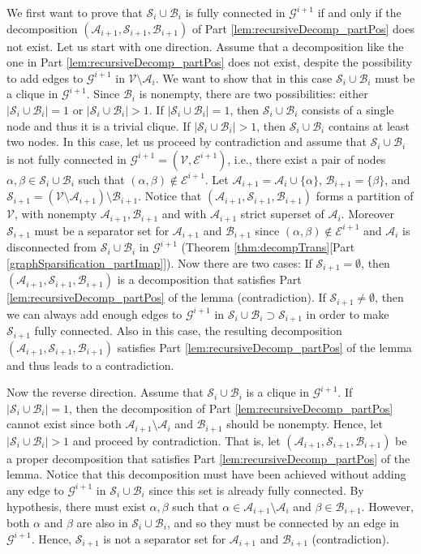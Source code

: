\documentclass[twoside,11pt]{article}
\newcommand{\Bc}{\mathcal{B}}
\newcommand{\Vc}{\mathcal{V}}
\newcommand{\Ec}{\mathcal{E}}
\newcommand{\Ac}{\mathcal{A}}
\newcommand{\Sc}{\mathcal{S}}
\newcommand{\Gcb}{\boldsymbol{\mathcal{G}}}
\newcommand{\Aset}{ \Ac }
\newcommand{\Bset}{ \Bc }
\newcommand{\Sset}{ \Sc }
\begin{document}
We first want to prove that 
$\Sset_i \cup \Bset_i$ is fully connected in $\Gcb^{i+1}$ if and only if
the decomposition $(\Aset_{i+1}, \Sset_{i+1}, \Bset_{i+1})$  of
Part \ref{lem:recursiveDecomp_partPos} does not exist.
Let us start with one direction.
%
%
%
Assume that a decomposition like the one in Part 
\ref{lem:recursiveDecomp_partPos}
does not exist, despite the
possibility to add edges to $\Gcb^{i+1}$ in $\Vc \setminus \Aset_i$. 
We want to show that in this case 
$\Sset_i \cup \Bset_i$ must be a clique in $\Gcb^{i+1}$.
Since $\Bset_i$ is nonempty, 
there are two possibilities: either $|\Sset_i \cup \Bset_i|=1$ or
$|\Sset_i \cup \Bset_i|>1$.
%
If $|\Sset_i \cup \Bset_i|=1$, then $\Sset_i \cup \Bset_i$ consists of a single node
and thus it is a trivial clique.
%
If $|\Sset_i \cup \Bset_i|>1$, then $\Sset_i \cup \Bset_i$ contains at least
two nodes.
In this case, let us proceed by contradiction and assume that $\Sset_i \cup \Bset_i$
is not fully connected in $\Gcb^{i+1}=(\Vc, \Ec^{i+1})$, i.e.,
there exist a pair of nodes
$\alpha,\beta \in \Sset_i \cup \Bset_i$ such that 
$(\alpha,\beta)\notin \Ec^{i+1}$. 
Let $\Aset_{i+1}=\Aset_i \cup \{\alpha \}$, $\Bset_{i+1}= \{\beta\}$, and
$\Sset_{i+1} = ( \Vc \setminus \Aset_{i+1} ) \setminus \Bset_{i+1}$.
Notice that $(\Aset_{i+1},\Sset_{i+1},\Bset_{i+1})$ forms a partition
of $\Vc$, with nonempty $\Aset_{i+1},\Bset_{i+1}$  and with $\Aset_{i+1}$
strict superset of $\Aset_{i}$.
Moreover $\Sset_{i+1}$ must be a separator set for  
$\Aset_{i+1}$ and $\Bset_{i+1}$ since $(\alpha,\beta)\notin \Ec^{i+1}$ and
$\Aset_i$ is disconnected from $\Sset_i \cup \Bset_i$ 
in $\Gcb^{i+1}$ (Theorem \ref{thm:decompTrans}[Part \ref{graphSparsification_partImap}]).
Now there are two cases: If $\Sset_{i+1} = \emptyset$, then 
$(\Aset_{i+1},\Sset_{i+1},\Bset_{i+1})$ is a decomposition 
that satisfies Part \ref{lem:recursiveDecomp_partPos} of the lemma (contradiction).
If $\Sset_{i+1} \neq \emptyset$, then we can always add enough edges to
$\Gcb^{i+1}$ in $\Sset_i \cup \Bset_i \supset \Sset_{i+1}$ 
in order to make $\Sset_{i+1}$ fully connected.
Also in this case, the resulting decomposition 
$(\Aset_{i+1},\Sset_{i+1},\Bset_{i+1})$ 
satisfies Part \ref{lem:recursiveDecomp_partPos} of the lemma and thus leads to
a  contradiction.

Now the reverse direction.
Assume that $\Sset_i \cup \Bset_i$ is a clique in $\Gcb^{i+1}$.
If $|\Sset_i \cup \Bset_i|=1$, then the decomposition of
Part \ref{lem:recursiveDecomp_partPos} cannot exist since both
$\Aset_{i+1}\setminus \Aset_i$ and $\Bset_{i+1}$ should  be nonempty.
Hence, let $|\Sset_i \cup \Bset_i|>1$ and  
proceed by contradiction.
That is, let $(\Aset_{i+1},\Sset_{i+1},\Bset_{i+1})$  be
a proper decomposition that
satisfies Part \ref{lem:recursiveDecomp_partPos} of the lemma.
Notice that this decomposition must have been achieved without 
adding any edge to $\Gcb^{i+1}$ in
$\Sset_i \cup \Bset_i$ since this set is already fully connected.
By hypothesis, there must exist $\alpha,\beta$ such that
$\alpha \in \Aset_{i+1}\setminus \Aset_i$ and $ \beta \in \Bset_{i+1}$.
However, both $\alpha$ and $\beta$ are also in $\Sset_i \cup \Bset_i$, and so
they must be connected by an edge in $\Gcb^{i+1}$. Hence,
$\Sset_{i+1}$ is not a separator set for $\Aset_{i+1}$
and $\Bset_{i+1}$ (contradiction).
\end{document}
